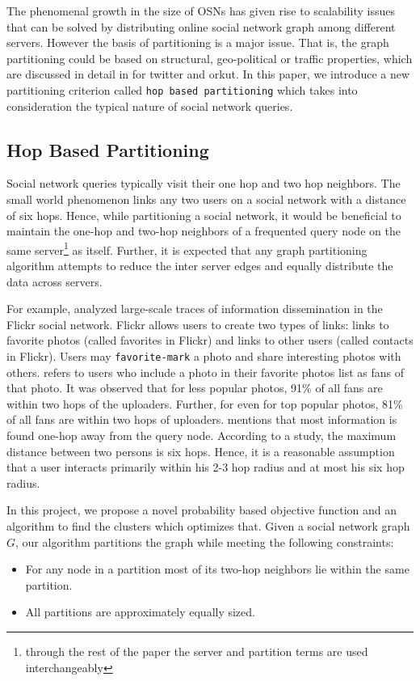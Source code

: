 \documentclass[letterpaper]{article}
\begin{document}
    The phenomenal growth in the size of OSNs has given rise to scalability
issues that can be solved by distributing online social network graph among
different servers. However the basis of partitioning  is a major issue. That
is, the graph partitioning could be based on structural, geo-political or
traffic properties, which are discussed in detail in \cite{arxviv} for twitter
and orkut. In this paper, we introduce a new partitioning criterion called
\texttt{hop based partitioning} which takes into consideration the typical
nature of social network queries.

\subsection{Hop Based Partitioning}

Social network queries typically visit their one hop and two hop neighbors. The
small world phenomenon links any two users on a social network with a distance
of six hops. Hence, while partitioning a social network, it would be beneficial
to maintain the one-hop and two-hop neighbors of a frequented query node on the
same server\footnote{through the rest of the paper the server and partition
terms are used interchangeably} as itself. Further, it is expected that any
graph partitioning algorithm attempts to reduce the inter server edges and
equally distribute the data across servers.

For example, \cite{flickr} analyzed large-scale traces of information
dissemination in the Flickr social network. Flickr allows users to create two
types of links: links to favorite photos (called favorites in Flickr) and links
to other users (called contacts in Flickr). Users may \texttt{favorite-mark} a
photo and share interesting photos with others. \cite{flickr} refers to users
who include a photo in their favorite photos list as fans of that photo. It was
observed that for less popular photos, 91\% of all fans are within two hops of
the uploaders. Further, for even for top popular photos, 81\% of all fans are
within two hops of uploaders. \cite{OHM} mentions that most information is
found one-hop away from the query node. According to a study\cite{4}, the
maximum distance between two persons is six hops. Hence, it is a reasonable
assumption that a user interacts primarily within his 2-3 hop radius and at
most his six hop radius.

    In this project, we propose a novel probability based objective function
and  an algorithm to find the clusters which optimizes that. Given a social
network graph $G$, our algorithm partitions the graph while meeting the
following constraints:
\begin{itemize}
\item For any node in a partition most of its two-hop neighbors lie within the same partition.
\item All partitions are approximately equally sized.
\end{itemize} 
\end{document}
